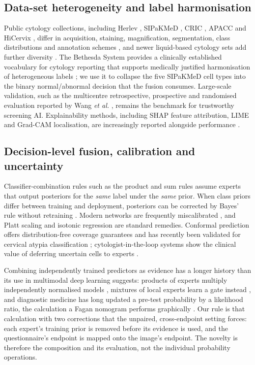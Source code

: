 \documentclass[lettersize,journal]{IEEEtran}
\begin{document}
\subsection{Data-set heterogeneity and label harmonisation}
Public cytology collections, including Herlev \cite{jantzen2005herlev}, SIPaKMeD \cite{plissiti2018sipakmed}, CRIC \cite{rezende2021cric}, APACC \cite{kupas2024apacc} and HiCervix \cite{cai2024hicervix}, differ in acquisition, staining, magnification, segmentation, class distributions and annotation schemes \cite{coskun2026robust}, and newer liquid-based cytology sets add further diversity \cite{hussain2020liquidbased}. The Bethesda System provides a clinically established vocabulary for cytology reporting that supports medically justified harmonisation of heterogeneous labels \cite{solomon2002bethesda,nayar2015bethesda}; we use it to collapse the five SIPaKMeD cell types into the binary normal/abnormal decision that the fusion consumes. Large-scale validation, such as the multicentre retrospective, prospective and randomised evaluation reported by Wang \emph{et al.} \cite{wang2024aiccs}, remains the benchmark for trustworthy screening AI. Explainability methods, including SHAP feature attribution, LIME and Grad-CAM localisation, are increasingly reported alongside performance \cite{vallescoral2026review}.

\subsection{Decision-level fusion, calibration and uncertainty}
Classifier-combination rules such as the product and sum rules \cite{kittler1998combining} assume experts that output posteriors for the \emph{same} label under the \emph{same} prior. When class priors differ between training and deployment, posteriors can be corrected by Bayes' rule without retraining \cite{saerens2002adjusting,lipton2018labelshift}. Modern networks are frequently miscalibrated \cite{guo2017calibration}, and Platt scaling \cite{platt1999probabilistic} and isotonic regression \cite{zadrozny2002transforming} are standard remedies. Conformal prediction offers distribution-free coverage guarantees \cite{vovk2005algorithmic,angelopoulos2023conformal} and has recently been validated for cervical atypia classification \cite{hagos2026conformal}; cytologist-in-the-loop systems show the clinical value of deferring uncertain cells to experts \cite{xue2023arcytologist}.

Combining independently trained predictors as evidence has a longer history than its use in multimodal deep learning suggests: products of experts multiply independently normalised models \cite{hinton2002poe}, mixtures of local experts learn a gate instead \cite{jacobs1991adaptive}, and diagnostic medicine has long updated a pre-test probability by a likelihood ratio, the calculation a Fagan nomogram performs graphically \cite{fagan1975nomogram}. Our rule is that calculation with two corrections that the unpaired, cross-endpoint setting forces: each expert's training prior is removed before its evidence is used, and the questionnaire's endpoint is mapped onto the image's endpoint. The novelty is therefore the composition and its evaluation, not the individual probability operations.
\end{document}
